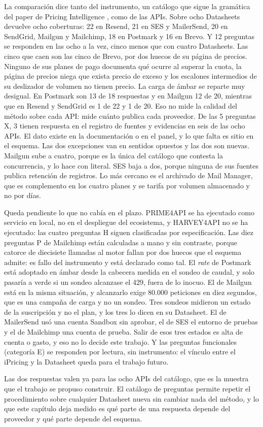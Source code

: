 La comparación dice tanto del instrumento, un catálogo que sigue la gramática
del paper de Pricing Intelligence
\citep{cavero2026pricingintelligence}, como de las APIs. Sobre ocho Datasheets
devuelve ocho coberturas: 22 en Resend, 21 en SES y MailerSend, 20 en SendGrid,
Mailgun y Mailchimp, 18 en Postmark y 16 en Brevo. Y 12 preguntas se responden
en las ocho a la vez, cinco menos que con cuatro Datasheets. Las cinco que
caen son las cinco de Brevo, por dos huecos de su página de precios. Ninguno
de sus planes de pago documenta qué ocurre al superar la cuota, la página de
precios niega que exista precio de exceso y los escalones intermedios de su
deslizador de volumen no tienen precio.
La carga de ámbar se reparte muy desigual. En Postmark son 13 de 18 respuestas
y en Mailgun 12 de 20, mientras que en Resend y SendGrid es 1 de 22 y 1 de 20.
Eso no mide la calidad del método sobre cada API: mide cuánto publica cada
proveedor.
De las 5 preguntas X, 3 tienen respuesta en el registro de fuentes y evidencias
en seis de las ocho APIs. El dato existe en la documentación o en el panel, y
lo que falta es sitio en el esquema. Las dos excepciones van en sentidos
opuestos y las dos son nuevas. Mailgun sube a cuatro, porque es la única del
catálogo que contesta la concurrencia, y lo hace con literal. SES baja a dos,
porque ninguna de sus fuentes publica retención de registros. Lo más cercano es
el archivado de Mail Manager, que es complemento en los cuatro planes y se
tarifa por volumen almacenado y no por días.

Queda pendiente lo que no cabía en el plazo. PRIME4API
\citep{gavira2026tfm} se ha ejecutado como servicio en local, no en el
despliegue del ecosistema, y HARVEY4API no se ha ejecutado: las cuatro
preguntas H siguen clasificadas por especificación. Las diez preguntas P de
Mailchimp están calculadas a mano y sin contraste, porque catorce de diecisiete
llamadas al motor fallan por dos huecos que el esquema admite: es fallo del
instrumento y está declarado como tal.
El \textit{rate} de Postmark está adoptado en ámbar desde la cabecera medida en
el sondeo de caudal, y solo pasaría a verde si un sondeo alcanzase el 429,
fuera de lo inocuo. El de Mailgun está en la misma situación, y alcanzarlo
exige 80.000 peticiones en diez segundos, que es una campaña de carga y no un
sondeo.
Tres sondeos midieron un estado de la suscripción y no el plan, y los tres lo dicen
en su Datasheet. El de MailerSend usó una cuenta Sandbox sin aprobar, el de SES
el entorno de pruebas y el de Mailchimp una cuenta de prueba. Salir de esos tres estados es alta de cuenta o gasto, y eso no lo
decide este trabajo.
Y las preguntas funcionales (categoría E) se responden por lectura, sin
instrumento: el vínculo entre el iPricing y la Datasheet queda para el trabajo
futuro.

Las dos respuestas valen ya para las ocho APIs del catálogo, que es la muestra
que el trabajo se propuso construir. El catálogo de preguntas permite repetir
el procedimiento sobre cualquier Datasheet nueva sin cambiar nada del método, y
lo que este capítulo deja medido es qué parte de una respuesta depende del
proveedor y qué parte depende del esquema.
